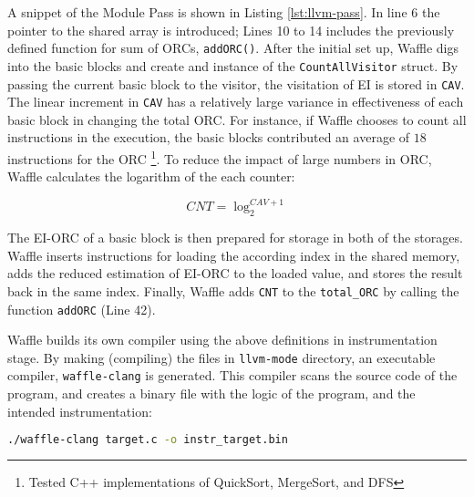 A snippet of the Module Pass is shown in Listing \ref{lst:llvm-pass}. In line 6 the pointer to the shared array is introduced; Lines 10 to 14 includes the previously defined function for sum of ORCs, \texttt{addORC()}. After the initial set up, Waffle digs into the basic blocks and create and instance of the \texttt{CountAllVisitor} struct. By passing the current basic block to the visitor, the visitation of EI is stored in \texttt{CAV}. The linear increment in \texttt{CAV} has a relatively large variance in effectiveness of each basic block in changing the total ORC. For instance, if Waffle chooses to count all instructions in the execution, the basic blocks contributed an average of $18$ instructions for the ORC \footnote{Tested C++ implementations of QuickSort, MergeSort, and DFS}. To reduce the impact of large numbers in ORC, Waffle calculates the logarithm of the each counter: 

\begin{equation}
  \label{eq:log}
  CNT = \log_{2}^{CAV+1} 
\end{equation}

The EI-ORC of a basic block is then prepared for storage in both of the storages. Waffle inserts instructions for loading the according index in the shared memory, adds the reduced estimation of EI-ORC to the loaded value, and stores the result back in the same index. Finally, Waffle adds \texttt{CNT} to the \texttt{total\_ORC} by calling the function \texttt{addORC} (Line 42).



Waffle builds its own compiler using the above definitions in instrumentation stage. By making (compiling) the files in \texttt{llvm-mode} directory, an executable compiler, \texttt{waffle-clang} is generated. This compiler scans the source code of the program, and creates a binary file with the logic of the program, and the intended instrumentation:

\begin{lstlisting}[language=bash,style=CommandStyle,label={lst:wafl-clang}]
  ./waffle-clang target.c -o instr_target.bin
\end{lstlisting}